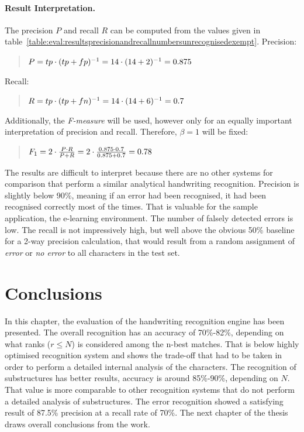 \paragraph{Result Interpretation.}
The precision \(P\) and recall \(R\) can be computed from the values given in 
table~\ref{table:eval:resultsprecisionandrecallnumbersunrecognisedexempt}.
Precision:
\begin{quote}
\(
P=tp \cdot (tp+fp)^{-1} \\
= 14 \cdot (14+2)^{-1} \\
= 0.875
\)
\end{quote}
Recall:
\begin{quote}
\(
R=tp \cdot (tp+fn)^{-1} \\
=14 \cdot (14+6)^{-1} \\
=0.7
\)  
\end{quote}
Additionally, the \emph{F-measure} will be used, however only for an equally 
important interpretation of precision and recall. Therefore, \(\beta = 1\) will
be fixed:
\begin{quote}
\(
F_{1} = 2 \cdot \frac{P \cdot R }{P + R} \\
 = 2 \cdot \frac{0.875 \cdot 0.7 }{0.875 + 0.7} \\
 = 0.78
\)
\end{quote}
The results are difficult to interpret because there are no other systems for 
comparison that perform a similar analytical handwriting recognition.
Precision is slightly below 90\%, meaning if an error had been recognised,
it had been recognised correctly most of the times.
That is valuable for the sample application, the e-learning environment.
The number of falsely detected errors is low.
The recall is not impressively high, 
but well above the obvious 50\% baseline for a 2-way precision calculation,
that would result from a random assignment of \emph{error} or \emph{no error}
to all characters in the test set.

\section{Conclusions}
\label{sec:eval:conclusions}

In this chapter, the evaluation of the handwriting recognition engine has 
been presented. The overall recognition has an accuracy of 70\%-82\%,
depending on what ranks (\(r \leq N\)) is considered among the n-best matches.
That is below highly optimised recognition system and shows the trade-off that
had to be taken in order to perform a detailed internal analysis of the 
characters.
The recognition of substructures has better results, accuracy is around
85\%-90\%, depending on \(N\). That value is more comparable to other 
recognition systems that do not perform a detailed analysis of substructures.
The error recognition showed a satisfying result of 87.5\% precision at a recall 
rate of 70\%.
The next chapter of the thesis draws overall conclusions from the work.
